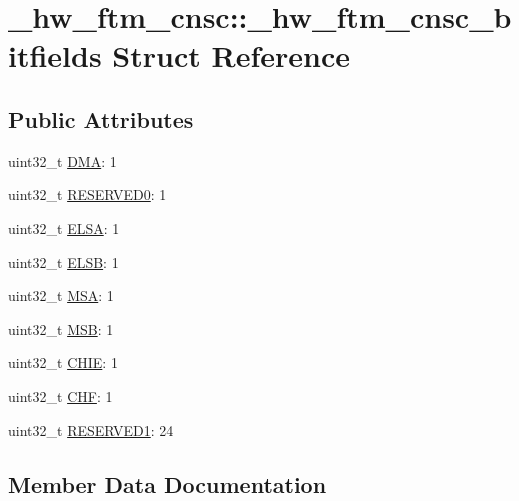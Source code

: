 \hypertarget{struct__hw__ftm__cnsc_1_1__hw__ftm__cnsc__bitfields}{}\section{\+\_\+hw\+\_\+ftm\+\_\+cnsc\+:\+:\+\_\+hw\+\_\+ftm\+\_\+cnsc\+\_\+bitfields Struct Reference}
\label{struct__hw__ftm__cnsc_1_1__hw__ftm__cnsc__bitfields}
\subsection*{Public Attributes}
\begin{DoxyCompactItemize}
\item 
uint32\+\_\+t \hyperlink{struct__hw__ftm__cnsc_1_1__hw__ftm__cnsc__bitfields_a68baa60faa0d37943fed93214ef76129}{D\+MA}\+: 1
\item 
uint32\+\_\+t \hyperlink{struct__hw__ftm__cnsc_1_1__hw__ftm__cnsc__bitfields_aeec65bf514f181321b25a3d10ca87e49}{R\+E\+S\+E\+R\+V\+E\+D0}\+: 1
\item 
uint32\+\_\+t \hyperlink{struct__hw__ftm__cnsc_1_1__hw__ftm__cnsc__bitfields_ae06076e1e3ac03e040f71d2946ecbc02}{E\+L\+SA}\+: 1
\item 
uint32\+\_\+t \hyperlink{struct__hw__ftm__cnsc_1_1__hw__ftm__cnsc__bitfields_a52aa116aa1fac13289fe0afcd3faf8e4}{E\+L\+SB}\+: 1
\item 
uint32\+\_\+t \hyperlink{struct__hw__ftm__cnsc_1_1__hw__ftm__cnsc__bitfields_af2a31df9b5915eaf74a7ff3a48eaa8a0}{M\+SA}\+: 1
\item 
uint32\+\_\+t \hyperlink{struct__hw__ftm__cnsc_1_1__hw__ftm__cnsc__bitfields_a787ffcbb353a2d014e34ecfe05c76b4e}{M\+SB}\+: 1
\item 
uint32\+\_\+t \hyperlink{struct__hw__ftm__cnsc_1_1__hw__ftm__cnsc__bitfields_a0d15f20b51a0c2fc2d738d77d67bf31f}{C\+H\+IE}\+: 1
\item 
uint32\+\_\+t \hyperlink{struct__hw__ftm__cnsc_1_1__hw__ftm__cnsc__bitfields_a1311e8c0773e3dbb90b971753d1fe2db}{C\+HF}\+: 1
\item 
uint32\+\_\+t \hyperlink{struct__hw__ftm__cnsc_1_1__hw__ftm__cnsc__bitfields_aad00d6f175fc0b2e6bb8fc7e078af120}{R\+E\+S\+E\+R\+V\+E\+D1}\+: 24
\end{DoxyCompactItemize}


\subsection{Member Data Documentation}
